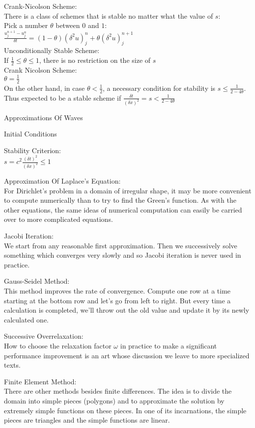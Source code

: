 Crank-Nicolson Scheme: \\
There is a class of schemes that is stable no matter what the value of $s$: \\
Pick a number $\theta$ between $0$ and $1$: \\
$\frac{u_j^{n+1}-u_j^n}{\delta t} = (1-\theta)(\delta^2 u)_j^n + \theta (\delta^2 u)_j^{n+1}$ \\
Unconditionally Stable Scheme: \\
If $\frac{1}{2} \le \theta \le 1$, there is no restriction on the size of $s$ \\
Crank Nicolson Scheme: \\
$\theta = \frac{1}{2}$ \\
On the other hand, in case $\theta < \frac{1}{2}$, a necessary condition for stability is $s \le \frac{1}{2-4 \theta}$. Thus expected to be a stable scheme if $\frac{\delta t}{(\delta x)^2} = s < \frac{1}{2-4 \theta}$

Approximations Of Waves

Initial Conditions

Stability Criterion: \\
$s = c^2 \frac{(\delta t)^2}{(\delta x)^2} \le 1$

Approximation Of Laplace's Equation: \\
For Dirichlet's problem in a domain of irregular shape, it may be more convenient to compute numerically than to try to find the Green's function. As with the other equations, the same ideas of numerical computation can easily be carried over to more complicated equations.

Jacobi Iteration: \\
We start from any reasonable first approximation. Then we successively solve something which converges very slowly and so Jacobi iteration is never used in practice.

Gauss-Seidel Method: \\
This method improves the rate of convergence. Compute one row at a time starting at the bottom row and let's go from left to right. But every time a calculation is completed, we'll throw out the old value and update it by its newly calculated one.

Successive Overrelaxation: \\
How to choose the relaxation factor $\omega$ in practice to make a significant performance improvement is an art whose discussion we leave to more specialized texts.

Finite Element Method: \\
There are other methods besides finite differences. The idea is to divide the domain into simple pieces (polygons) and to approximate the solution by extremely simple functions on these pieces. In one of its incarnations, the simple pieces are triangles and the simple functions are linear.

